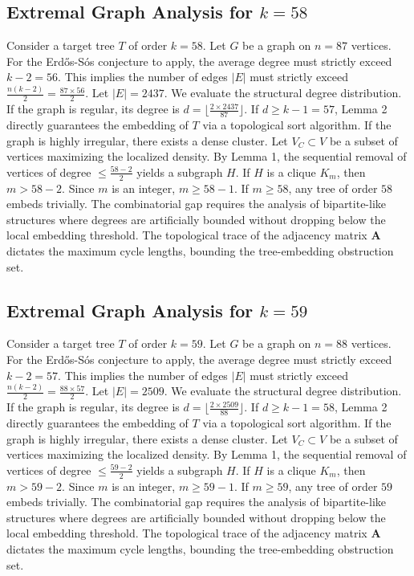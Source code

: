 \documentclass[11pt,a4paper]{article}
\begin{document}
\subsection{Extremal Graph Analysis for $k=58$}
Consider a target tree $T$ of order $k=58$.
Let $G$ be a graph on $n=87$ vertices.
For the Erd\H{o}s-S\'os conjecture to apply, the average degree must strictly exceed $k-2 = 56$.
This implies the number of edges $|E|$ must strictly exceed $\frac{n(k-2)}{2} = \frac{87 \times 56}{2}$.
Let $|E| = 2437$.
We evaluate the structural degree distribution. If the graph is regular, its degree is $d = \lfloor \frac{2 \times 2437}{87} \rfloor$.
If $d \geq k-1 = 57$, Lemma 2 directly guarantees the embedding of $T$ via a topological sort algorithm.
If the graph is highly irregular, there exists a dense cluster. Let $V_C \subset V$ be a subset of vertices maximizing the localized density.
By Lemma 1, the sequential removal of vertices of degree $\leq \frac{58-2}{2}$ yields a subgraph $H$.
If $H$ is a clique $K_{m}$, then $m > 58-2$. Since $m$ is an integer, $m \geq 58-1$. If $m \geq 58$, any tree of order $58$ embeds trivially.
The combinatorial gap requires the analysis of bipartite-like structures where degrees are artificially bounded without dropping below the local embedding threshold. The topological trace of the adjacency matrix $\mathbf{A}$ dictates the maximum cycle lengths, bounding the tree-embedding obstruction set.


\subsection{Extremal Graph Analysis for $k=59$}
Consider a target tree $T$ of order $k=59$.
Let $G$ be a graph on $n=88$ vertices.
For the Erd\H{o}s-S\'os conjecture to apply, the average degree must strictly exceed $k-2 = 57$.
This implies the number of edges $|E|$ must strictly exceed $\frac{n(k-2)}{2} = \frac{88 \times 57}{2}$.
Let $|E| = 2509$.
We evaluate the structural degree distribution. If the graph is regular, its degree is $d = \lfloor \frac{2 \times 2509}{88} \rfloor$.
If $d \geq k-1 = 58$, Lemma 2 directly guarantees the embedding of $T$ via a topological sort algorithm.
If the graph is highly irregular, there exists a dense cluster. Let $V_C \subset V$ be a subset of vertices maximizing the localized density.
By Lemma 1, the sequential removal of vertices of degree $\leq \frac{59-2}{2}$ yields a subgraph $H$.
If $H$ is a clique $K_{m}$, then $m > 59-2$. Since $m$ is an integer, $m \geq 59-1$. If $m \geq 59$, any tree of order $59$ embeds trivially.
The combinatorial gap requires the analysis of bipartite-like structures where degrees are artificially bounded without dropping below the local embedding threshold. The topological trace of the adjacency matrix $\mathbf{A}$ dictates the maximum cycle lengths, bounding the tree-embedding obstruction set.
\end{document}
